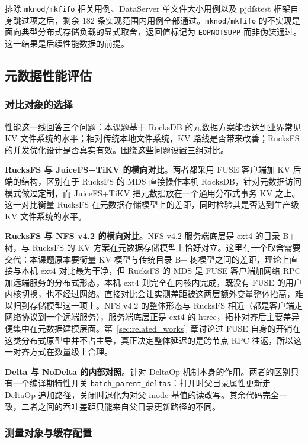 排除 \texttt{mknod}/\texttt{mkfifo} 相关用例、DataServer 单文件大小用例以及 pjdfstest 框架自身跳过项之后，剩余 182 条实现范围内用例全部通过。\texttt{mknod}/\texttt{mkfifo} 的不实现是面向典型分布式存储负载的显式取舍，返回值标记为 \texttt{EOPNOTSUPP} 而非伪装通过。这一结果是后续性能数据的前提。

\subsection{元数据性能评估}
\label{sec:perf}

\subsubsection{对比对象的选择}
\label{sec:perf-setup}

性能这一线回答三个问题：本课题基于 RocksDB 的元数据方案能否达到业界常见 KV 文件系统的水平；相对传统本地文件系统，KV 路线是否带来改善；RucksFS 的并发优化设计是否真实有效。围绕这些问题设置三组对比。

\textbf{RucksFS 与 JuiceFS+TiKV 的横向对比}。两者都采用 FUSE 客户端加 KV 后端的结构，区别在于 RucksFS 的 MDS 直接操作本机 RocksDB，针对元数据访问模式做过定制，而 JuiceFS+TiKV 把元数据放在一个通用分布式事务 KV 之上。这一对比衡量 RucksFS 在元数据存储模型上的差距，同时检验其是否达到生产级 KV 文件系统的水平。

\textbf{RucksFS 与 NFS v4.2 的横向对比}。NFS v4.2 服务端底层是 ext4 的目录 B+ 树，与 RucksFS 的 KV 方案在元数据存储模型上恰好对立。这里有一个取舍需要交代：本课题原本要衡量 KV 模型与传统目录 B+ 树模型之间的差距，理论上直接与本机 ext4 对比最为干净，但 RucksFS 的 MDS 是 FUSE 客户端加网络 RPC 加远端服务的分布式形态，本机 ext4 则完全在内核内完成，既没有 FUSE 的用户内核切换，也不经过网络。直接对比会让实测差距被这两层额外变量整体抬高，难以归到存储模型这一项上。NFS v4.2 的整体形态与 RucksFS 相近（都是客户端走网络协议到一个远端服务），服务端底层正是 ext4 的 htree，拓扑对齐后主要差异便集中在元数据建模层面。第~\ref{sec:related_works}~章讨论过 FUSE 自身的开销在这类分布式原型中并不占主导，真正决定整体延迟的是跨节点 RPC 往返，所以这一对齐方式在数量级上合理。

\textbf{Delta 与 NoDelta 的内部对照}。针对 DeltaOp 机制本身的作用。两者的区别只有一个编译期特性开关 \texttt{batch\_parent\_deltas}：打开时父目录属性更新走 DeltaOp 追加路径，关闭时退化为对父 inode 基值的读改写。其余代码完全一致，二者之间的吞吐差距只能来自父目录更新路径的不同。

\subsubsection{测量对象与缓存配置}
\label{sec:perf-cache}

